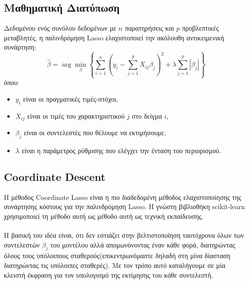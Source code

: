 \documentclass[12pt]{article}
\begin{document}
\subsection{Μαθηματική Διατύπωση}
Δεδομένου ενός συνόλου δεδομένων με $n$ παρατηρήσεις και $p$ προβλεπτικές μεταβλητές, η παλινδρόμηση \textlatin{Lasso} ελαχιστοποιεί την ακόλουθη αντικειμενική συνάρτηση:
\begin{equation}
    \hat{\beta} = \arg \min_{\beta} \left\{ \sum_{i=1}^{n} (y_i - \sum_{j=1}^{p} X_{ij} \beta_j)^2 + \lambda \sum_{j=1}^{p} |\beta_j| \right\}
\end{equation}
όπου:
\begin{itemize}
    \item $y_i$ είναι οι πραγματικές τιμές-στόχοι,
    \item $X_{ij}$ είναι οι τιμές του χαρακτηριστικού $j$ στο δείγμα $i$,
    \item $\beta_j$ είναι οι συντελεστές που θέλουμε να εκτιμήσουμε,
    \item $\lambda$ είναι η παράμετρος ρύθμισης που ελέγχει την ένταση του περιορισμού.
\end{itemize}

\subsection{\textlatin{Coordinate Descent}}
Η μέθοδος \textlatin{Coordinate Lasso} είναι η πιο διαδεδομένη μέθοδος ελαχιστοποίησης της συνάρτησης κόστους για την παλινδρόμηση \textlatin{Lasso}. Η γνώστη βιβλιοθήκη \textlatin{scikit-learn} χρησιμοποιεί τη μέθοδο αυτή ως μέθοδο αυτή ως τεχνική εκπαίδευσης.\\
\vspace{0.1pt}\\

Η βασική του ιδέα  είναι, ότι δεν εστιάζει στην βελτιστοποίηση ταυτόχρονα όλων των συντελεστών $\beta_j$ του μοντέλου αλλά απομωνόνοντας έναν κάθε φορά, διατηρώντας όλους τους υπόλοιπους σταθερούς(επικεντρωνόμαστε δηλαδή στη μίνα δίασταση διατηρώντας τις υπόλοιπες σταθερές). Με τον τρόπο αυτό καταλήγουμε σε μία κλειστή έκφραση για τον υπολογισμό της εκτίμησης του κάθε συντελεστή.\\
\end{document}
